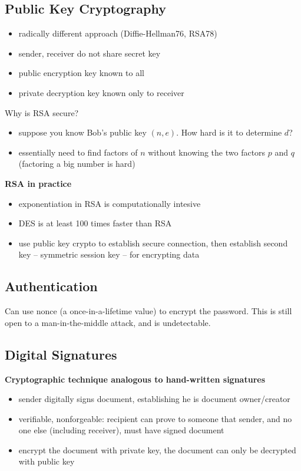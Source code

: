\subsection{Public Key Cryptography}
\begin{itemize}
	\item radically different approach (Diffie-Hellman76, RSA78)
	\item sender, receiver do not share secret key
	\item public encryption key known to all
	\item private decryption key known only to receiver
\end{itemize}
\begin{note}{Why is RSA secure?}
	\begin{itemize}
		\item suppose you know Bob's public key $(n,e)$. How hard is it to determine $d$?
		\item essentially need to find factors of $n$ without knowing the two factors $p$ and $q$ (factoring a big number is hard)
	\end{itemize}
\end{note}
\textbf{RSA in practice}
\begin{itemize}
	\item exponentiation in RSA is computationally intesive
	\item DES is at least 100 times faster than RSA
	\item use public key crypto to establish secure connection, then establish second key -- symmetric session key -- for encrypting data
\end{itemize}

\subsection{Authentication}
Can use nonce (a once-in-a-lifetime value) to encrypt the password. This is still open to a man-in-the-middle attack, and is undetectable.

\subsection{Digital Signatures}
\textbf{Cryptographic technique analogous to hand-written signatures}
\begin{itemize}
	\item sender digitally signs document, establishing he is document owner/creator
	\item verifiable, nonforgeable: recipient can prove to someone that sender, and no one else (including receiver), must have signed document
	\item encrypt the document with private key, the document can only be decrypted with public key
\end{itemize}

